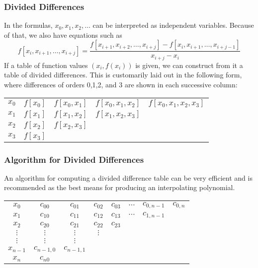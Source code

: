 \documentclass[notheorems,mathserif,table,compress]{beamer}  %
\begin{document}
\begin{frame}
  \frametitle{Divided Differences}
  In the formulas, $x_0,x_1,x_2,\ldots$ can be interpreted as independent variables. Because of that, we also have equations such as
  \begin{displaymath}
  f[x_i,x_{i+1},\ldots,x_{i+j}]=\frac{f[x_{i+1},x_{i+2},\ldots,x_{i+j}]-f[x_i,x_{i+1},\ldots,x_{i+j-1}]}{x_{i+j}-x_i}
  \end{displaymath}
  If a table of function values $(x_i,f(x_i))$ is given, we can construct from it a table of divided differences. This is customarily laid out in the following form, where differences of orders 0,1,2, and 3 are shown in each successive column:\\
  \begin{tabular}{c c| c c c}
  $x_0$ & $f[x_0]$ & $f[x_0,x_1]$ & $f[x_0,x_1,x_2]$ & $f[x_0,x_1,x_2,x_3]$\\
  $x_1$ & $f[x_1]$ & $f[x_1,x_2]$ & $f[x_1,x_2,x_3]$ &  \\
  $x_2$ & $f[x_2]$ & $f[x_2,x_3]$ &                  &  \\
  $x_3$ & $f[x_3]$ &              &                  &  \\
  \end{tabular}
\end{frame}


\begin{frame}
  \frametitle{Algorithm for Divided Differences}
  An algorithm for computing a divided difference table can be very efficient and is recommended as the best means for producing an interpolating polynomial.\\
  \begin{tabular}{c c| c c c c c c}
  $x_0$     & $c_{00}$     & $c_{01}$    &  $c_{02}$ & $c_{03}$ & $\cdots$ & $c_{0,n-1}$ &$c_{0,n}$\\
  $x_1$     & $c_{10}$     & $c_{11}$    &  $c_{12}$ & $c_{13}$ & $\cdots$ & $c_{1,n-1}$ & \\
  $x_2$     & $c_{20}$     & $c_{21}$    &  $c_{22}$ & $c_{23}$ &          &             & \\
  $\vdots$  & $\vdots$     & $\vdots$    &  $\vdots$ &          &          &             & \\
  $\vdots$  & $\vdots$     & $\vdots$    &           &          &          &             & \\
  $x_{n-1}$ &$c_{n-1,0}$   & $c_{n-1,1}$ &           &          &          &             & \\
  $x_n$     & $c_{n0}$     &             &           &          &          &             & \\
  \end{tabular}
\end{frame}
\end{document}

